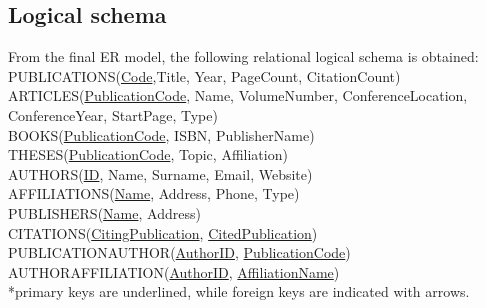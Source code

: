 \documentclass[a4paper,12pt]{article}
\begin{document}
\subsection{Logical schema} \label{subsec:schema-relazionale}

From the final ER model, the following relational logical schema is obtained:
\\PUBLICATIONS(\underline{Code},Title, Year, PageCount, CitationCount) \\
ARTICLES(\underline{PublicationCode}, Name, VolumeNumber, ConferenceLocation, ConferenceYear, StartPage, Type) \\
BOOKS(\underline{PublicationCode}, ISBN, PublisherName) \\
THESES(\underline{PublicationCode}, Topic, Affiliation) \\
AUTHORS(\underline{ID}, Name, Surname, Email, Website) \\
AFFILIATIONS(\underline{Name}, Address, Phone, Type) \\
PUBLISHERS(\underline{Name}, Address) \\
CITATIONS(\underline{CitingPublication}, \underline{CitedPublication}) \\
PUBLICATIONAUTHOR(\underline{AuthorID}, \underline{PublicationCode}) \\
AUTHORAFFILIATION(\underline{AuthorID}, \underline{AffiliationName}) \\
*primary keys are underlined, while foreign keys are indicated with arrows.
\end{document}
